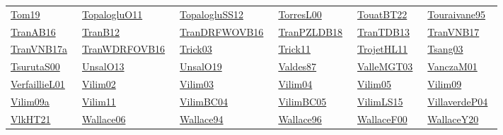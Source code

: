 \begin{longtable}{*{6}{l}}
\href{../works/Tom19.pdf}{Tom19}~\cite{Tom19} & \href{../works/TopalogluO11.pdf}{TopalogluO11}~\cite{TopalogluO11} & \href{../}{TopalogluSS12}~\cite{TopalogluSS12} & \href{../works/TorresL00.pdf}{TorresL00}~\cite{TorresL00} & \href{../works/TouatBT22.pdf}{TouatBT22}~\cite{TouatBT22} & \href{../works/Touraivane95.pdf}{Touraivane95}~\cite{Touraivane95}\\ 
\href{../works/TranAB16.pdf}{TranAB16}~\cite{TranAB16} & \href{../works/TranB12.pdf}{TranB12}~\cite{TranB12} & \href{../works/TranDRFWOVB16.pdf}{TranDRFWOVB16}~\cite{TranDRFWOVB16} & \href{../works/TranPZLDB18.pdf}{TranPZLDB18}~\cite{TranPZLDB18} & \href{../works/TranTDB13.pdf}{TranTDB13}~\cite{TranTDB13} & \href{../works/TranVNB17.pdf}{TranVNB17}~\cite{TranVNB17}\\ 
\href{../works/TranVNB17a.pdf}{TranVNB17a}~\cite{TranVNB17a} & \href{../works/TranWDRFOVB16.pdf}{TranWDRFOVB16}~\cite{TranWDRFOVB16} & \href{../}{Trick03}~\cite{Trick03} & \href{../}{Trick11}~\cite{Trick11} & \href{../works/TrojetHL11.pdf}{TrojetHL11}~\cite{TrojetHL11} & \href{../works/Tsang03.pdf}{Tsang03}~\cite{Tsang03}\\ 
\href{../}{TsurutaS00}~\cite{TsurutaS00} & \href{../works/UnsalO13.pdf}{UnsalO13}~\cite{UnsalO13} & \href{../works/UnsalO19.pdf}{UnsalO19}~\cite{UnsalO19} & \href{../works/Valdes87.pdf}{Valdes87}~\cite{Valdes87} & \href{../works/ValleMGT03.pdf}{ValleMGT03}~\cite{ValleMGT03} & \href{../works/VanczaM01.pdf}{VanczaM01}~\cite{VanczaM01}\\ 
\href{../works/VerfaillieL01.pdf}{VerfaillieL01}~\cite{VerfaillieL01} & \href{../works/Vilim02.pdf}{Vilim02}~\cite{Vilim02} & \href{../works/Vilim03.pdf}{Vilim03}~\cite{Vilim03} & \href{../works/Vilim04.pdf}{Vilim04}~\cite{Vilim04} & \href{../works/Vilim05.pdf}{Vilim05}~\cite{Vilim05} & \href{../works/Vilim09.pdf}{Vilim09}~\cite{Vilim09}\\ 
\href{../works/Vilim09a.pdf}{Vilim09a}~\cite{Vilim09a} & \href{../works/Vilim11.pdf}{Vilim11}~\cite{Vilim11} & \href{../works/VilimBC04.pdf}{VilimBC04}~\cite{VilimBC04} & \href{../works/VilimBC05.pdf}{VilimBC05}~\cite{VilimBC05} & \href{../works/VilimLS15.pdf}{VilimLS15}~\cite{VilimLS15} & \href{../}{VillaverdeP04}~\cite{VillaverdeP04}\\ 
\href{../works/VlkHT21.pdf}{VlkHT21}~\cite{VlkHT21} & \href{../works/Wallace06.pdf}{Wallace06}~\cite{Wallace06} & \href{../}{Wallace94}~\cite{Wallace94} & \href{../works/Wallace96.pdf}{Wallace96}~\cite{Wallace96} & \href{../}{WallaceF00}~\cite{WallaceF00} & \href{../works/WallaceY20.pdf}{WallaceY20}~\cite{WallaceY20}\\ 

\end{longtable}
